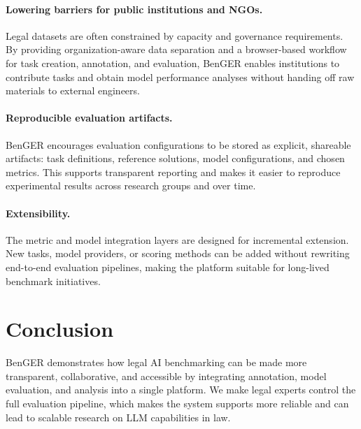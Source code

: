 \documentclass[sigconf]{acmart}
\begin{document}
\paragraph{Lowering barriers for public institutions and NGOs.}
Legal datasets are often constrained by capacity and governance requirements. By providing organization-aware data separation and a browser-based workflow for task creation, annotation, and evaluation, BenGER enables institutions to contribute tasks and obtain model performance analyses without handing off raw materials to external engineers.

\paragraph{Reproducible evaluation artifacts.}
BenGER encourages evaluation configurations to be stored as explicit, shareable artifacts: task definitions, reference solutions, model configurations, and chosen metrics. This supports transparent reporting and makes it easier to reproduce experimental results across research groups and over time.

\paragraph{Extensibility.}
The metric and model integration layers are designed for incremental extension. New tasks, model providers, or scoring methods can be added without rewriting end-to-end evaluation pipelines, making the platform suitable for long-lived benchmark initiatives.

\section{Conclusion}

BenGER demonstrates how legal AI benchmarking can be made more transparent, collaborative, and accessible by integrating annotation, model evaluation, and analysis into a single platform. We make legal experts control the full evaluation pipeline, which makes the system supports more reliable and can lead to scalable research on LLM capabilities in law.



\end{document}
